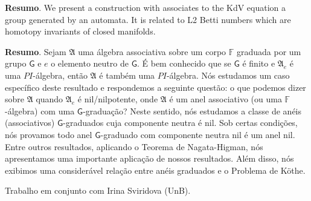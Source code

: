 \vspace{24pt}



\noindent\textbf{Resumo}.\label{az} 
We present a construction with associates to the KdV equation a group generated by an automata. It is related to L2 Betti numbers which are homotopy invariants of closed manifolds.


\vspace{24pt}



\noindent\textbf{Resumo}.\label{amdf} 
Sejam $\mathfrak{A}$ uma \'{a}lgebra associativa sobre um corpo $\mathbb{F}$ graduada por um grupo $\mathsf{G}$ e $e$ o elemento neutro de $\mathsf{G}$. \'{E} bem conhecido que se $\mathsf{G}$ é finito e $\mathfrak{A}_e$ \'{e} uma $PI$-\'{a}lgebra, ent\~{a}o $\mathfrak{A}$ \'{e} tamb\'{e}m uma $PI$-\'{a}lgebra. N\'{o}s estudamos um caso espec\'{i}fico deste resultado e respondemos a seguinte quest\~{a}o: o que podemos dizer sobre $\mathfrak{A}$ quando $\mathfrak{A}_e$ \'{e} nil/nilpotente, onde $\mathfrak{A}$ \'{e} um anel associativo (ou uma $\mathbb{F}$-\'{a}lgebra) com uma $\mathsf{G}$-gradua\c{c}\~{a}o? Neste sentido, n\'{o}s estudamos a classe de an\'{e}is (associativos) $\mathsf{G}$-graduados cuja componente neutra \'{e} nil. Sob certas condi\c{c}\~{o}es, n\'{o}s provamos todo anel $\mathsf{G}$-graduado com componente neutra nil \'{e} um anel nil. Entre outros resultados, aplicando o Teorema de Nagata-Higman, n\'{o}s apresentamos uma importante aplica\c{c}\~{a}o de nossos resultados. Al\'{e}m disso, n\'{o}s exibimos uma consider\'{a}vel rela\c{c}\~{a}o entre an\'{e}is graduados e o Problema de K\"{o}the.

\vspace*{0.5cm} \noindent Trabalho em conjunto com Irina Sviridova (UnB).

\vspace{24pt}



